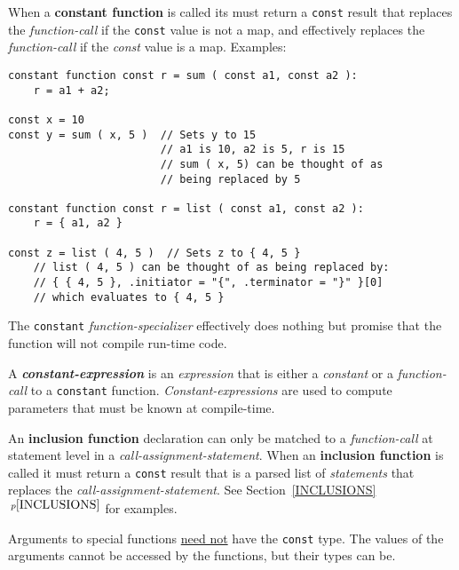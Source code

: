 \documentclass[12pt]{article}
\newcommand{\key}[1]{{\rm \bfseries #1}}
\newcommand{\emkey}[1]{{\em \bfseries #1}}
\newcommand{\itemref}[1]{\ref{#1}$\,^{p\pageref{#1}}$}
\newenvironment{indpar}[1][0.3in]%
	{\begin{list}{}%
		     {\setlength{\itemsep}{0in}%
		      \setlength{\topsep}{0in}%
		      \setlength{\parsep}{1ex}%
		      \setlength{\labelwidth}{#1}%
		      \setlength{\leftmargin}{#1}%
		      \addtolength{\leftmargin}{\labelsep}}%
	 \item}%
	{\end{list}}
\begin{document}
When a \key{constant function}\label{CONSTANT-FUNCTION} is called
its must return a {\tt const} result that replaces
the {\em function-call} if the {\tt const} value is not a map,
and effectively replaces the {\em function-call} if the {\em const}
value is a map.  Examples:
\begin{indpar}\begin{verbatim}
constant function const r = sum ( const a1, const a2 ):
    r = a1 + a2;

const x = 10
const y = sum ( x, 5 )  // Sets y to 15
                        // a1 is 10, a2 is 5, r is 15
                        // sum ( x, 5) can be thought of as
                        // being replaced by 5

constant function const r = list ( const a1, const a2 ):
    r = { a1, a2 }

const z = list ( 4, 5 )  // Sets z to { 4, 5 }
    // list ( 4, 5 ) can be thought of as being replaced by:
    // { { 4, 5 }, .initiator = "{", .terminator = "}" }[0]
    // which evaluates to { 4, 5 }
\end{verbatim}\end{indpar}

The {\tt constant} {\em function-specializer} effectively does nothing
but promise that the function will not compile run-time code.

A \emkey{constant-expression}\label{CONSTANT-EXPRESSION}
is an {\em expression} that is either
a {\em constant} or a {\em function-call} to a {\tt constant} function.
{\em Constant-expressions} are used to compute parameters that must be
known at compile-time.

An \key{inclusion function} declaration can only be matched to
a {\em function-call} at statement level in a {\em call-assign\-ment-statement}.
When an \key{inclusion function} is called it must return a {\tt const} result
that is a parsed list of {\em statements} that replaces
the {\em call-assignment-statement}.
See Section~\itemref{INCLUSIONS} for examples.

Arguments to special functions \underline{need not} have the {\tt const}
type.  The values of the arguments cannot be accessed by the functions,
but their types can be.
\end{document}
